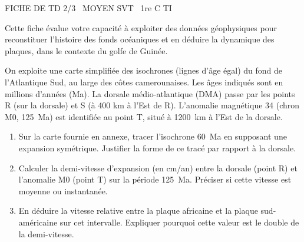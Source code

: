 \documentclass[11pt]{article}
\begin{document}
\begin{tcolorbox}[enhanced,colback=popink,colframe=popink,arc=10pt,boxrule=0pt,left=12pt,right=12pt,top=9pt,bottom=9pt]
{\color{white}\popxbold\small FICHE DE TD 2/3 \textbullet\ MOYEN \hfill SVT \textbullet\ 1re C TI\par}
\end{tcolorbox}
\vspace{4pt}
Cette fiche évalue votre capacité à exploiter des données géophysiques pour reconstituer l'histoire des fonds océaniques et en déduire la dynamique des plaques, dans le contexte du golfe de Guinée.

\begin{exercice}
\label{exo:ages}
On exploite une carte simplifiée des isochrones (lignes d'âge égal) du fond de l'Atlantique Sud, au large des côtes camerounaises. Les âges indiqués sont en millions d'années (Ma). La dorsale médio-atlantique (DMA) passe par les points R (sur la dorsale) et S (à 400 km à l'Est de R). L'anomalie magnétique 34 (chron M0, \SI{125}{Ma}) est identifiée au point T, situé à \SI{1200}{km} à l'Est de la dorsale.
\begin{enumerate}
    \item[2 pts] Sur la carte fournie en annexe, tracer l'isochrone \SI{60}{Ma} en supposant une expansion symétrique. Justifier la forme de ce tracé par rapport à la dorsale.
    \item[3 pts] Calculer la demi-vitesse d'expansion (en cm/an) entre la dorsale (point R) et l'anomalie M0 (point T) sur la période \SI{125}{Ma}. Préciser si cette vitesse est moyenne ou instantanée.
    \item[2 pts] En déduire la vitesse relative entre la plaque africaine et la plaque sud-américaine sur cet intervalle. Expliquer pourquoi cette valeur est le double de la demi-vitesse.
\end{enumerate}
\end{exercice}
\end{document}
